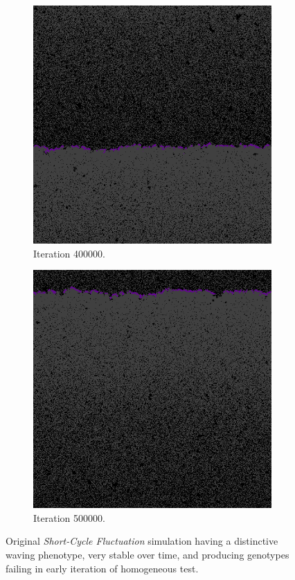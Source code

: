 \begin{figure}[H]
\begin{subfigure}{.25\textwidth}
  \centering
  \includegraphics[width=.9\linewidth]{img/sm400000}
  \caption{Iteration 400000.}
\end{subfigure}%
\begin{subfigure}{.25\textwidth}
  \centering
  \includegraphics[width=.9\linewidth]{img/sm500000}
  \caption{Iteration 500000.}
\end{subfigure}
\caption{Original \emph{Short-Cycle Fluctuation} simulation having a distinctive waving phenotype, very stable over time, and producing genotypes failing in early iteration of homogeneous test.}
\label{fig:smalldistinctive}
\end{figure}